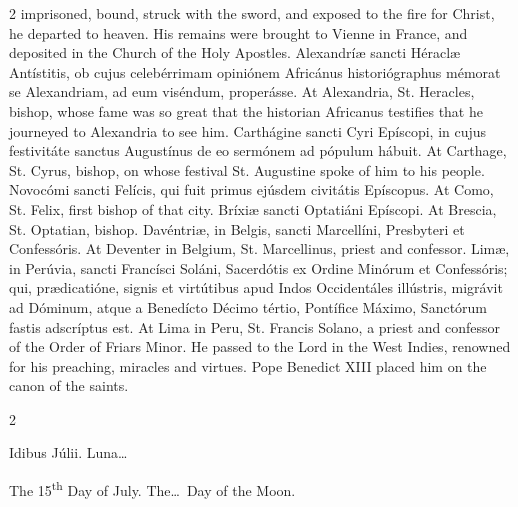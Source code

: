 \begin{paracol}{2}
 imprisoned, bound, struck with the sword, and exposed to the fire for 
 Christ, he departed to heaven. His remains were brought to Vienne in 
 France, and deposited in the Church of the Holy Apostles.
\switchcolumn*
{}
Alexandríæ sancti 
 Héraclæ Antístitis, ob cujus celebérrimam opiniónem Africánus 
 historiógraphus mémorat se Alexandriam, ad eum viséndum, properásse.
\switchcolumn
{}
At Alexandria, St. Heracles, bishop, 
 whose fame was so great that the historian Africanus testifies that he 
 journeyed to Alexandria to see him.
\switchcolumn*
{}
Carthágine sancti Cyri 
 Epíscopi, in cujus festivitáte sanctus Augustínus de eo sermónem ad pópulum 
 hábuit.
\switchcolumn
{}
At Carthage, St. Cyrus, bishop, on 
 whose festival St. Augustine spoke of him to his people.
\switchcolumn*
{}
Novocómi sancti Felícis, 
 qui fuit primus ejúsdem civitátis Epíscopus.
\switchcolumn
{}
At Como, St. Felix, first bishop of 
 that city.
\switchcolumn*
{}
Bríxiæ sancti Optatiáni 
 Epíscopi.
\switchcolumn
{}
At Brescia, St. Optatian, bishop.
\switchcolumn*
{}
Davéntriæ, in Belgis, 
 sancti Marcellíni, Presbyteri et Confessóris.
\switchcolumn
{}
At Deventer in Belgium, St. 
 Marcellinus, priest and confessor.
\switchcolumn*
{}
Limæ, in Perúvia, 
 sancti Francísci Soláni, Sacerdótis ex Ordine Minórum et Confessóris; qui, 
 prædicatióne, signis et virtútibus apud Indos Occidentáles illústris, 
 migrávit ad Dóminum, atque a Benedícto Décimo tértio, Pontífice Máximo, 
 Sanctórum fastis adscríptus est.
\switchcolumn
{}
At Lima in Peru, St. Francis Solano, 
 a priest and confessor of the Order of Friars Minor. He passed to the 
 Lord in the West Indies, renowned for his preaching, miracles and virtues. 
 Pope Benedict XIII placed him on the canon of the saints.
\switchcolumn*
{}
\end{paracol}


\begin{paracol}{2}
\begin{center}{\color{gregoriocolor} Idibus Júlii. 
 Luna\dots\ }\end{center}
\switchcolumn
{}
\begin{center}{\color{gregoriocolor} The 
 15\textsuperscript{th} Day of 
 July. The\dots\ Day of the Moon.}\end{center}
\end{paracol}

